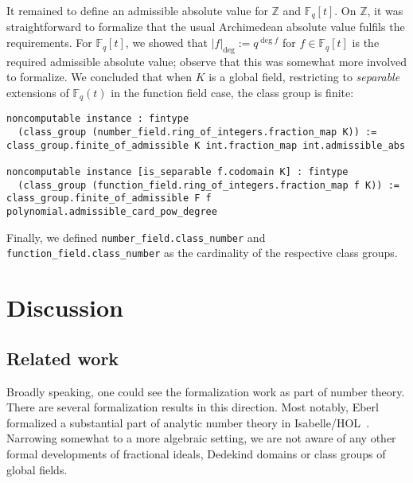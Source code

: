 \documentclass[a4paper,USenglish,cleveref, autoref, thm-restate]{lipics-v2021}
\newcommand{\lean}[1]{\texttt{#1}\xspace} %
\newcommand*{\Fq}[1][q]{\mathbb{F}_{#1}}
\newcommand{\Z}{\mathbb{Z}}
\begin{document}
It remained to define an admissible absolute value for $\Z$ and $\Fq[q][t]$. On $\Z$, it was straightforward to formalize that the usual Archimedean absolute value fulfils the requirements. For $\Fq[q][t]$, we showed that $\lvert f\rvert_{\deg}:=q^{\deg f}$ for $f \in \Fq[q][t]$ is the required admissible absolute value; observe that this was somewhat more involved to formalize.
We concluded that when $K$ is a global field, restricting to \emph{separable} extensions of $\Fq[q](t)$ in the function field case, the class group is finite:
\begin{lstlisting}
noncomputable instance : fintype
  (class_group (number_field.ring_of_integers.fraction_map K)) :=
class_group.finite_of_admissible K int.fraction_map int.admissible_abs

noncomputable instance [is_separable f.codomain K] : fintype
  (class_group (function_field.ring_of_integers.fraction_map f K)) :=
class_group.finite_of_admissible F f polynomial.admissible_card_pow_degree
\end{lstlisting}

Finally, we defined \lean{number\_field.class\_number} and \lean{function\_field.class\_number} as the cardinality of the respective class groups.

\section{Discussion}

\subsection{Related work}

Broadly speaking, one could see the formalization work as part of number theory. There are several formalization results in this direction.%
Most notably, Eberl formalized a substantial part of analytic number theory in Isabelle/HOL~\cite{Eberl19}.
Narrowing somewhat to a more algebraic setting, we are not aware of any other formal developments of fractional ideals, Dedekind domains or class groups of global fields.
\end{document}
